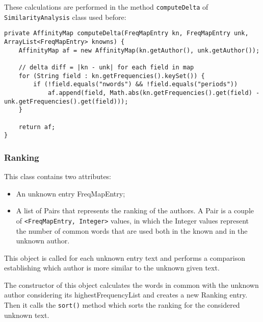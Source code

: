 \documentclass[a4paper,11pt, twoside]{article}
\begin{document}
	\noindent
	These calculations are performed in the method \lstinline|computeDelta| of \lstinline|SimilarityAnalysis| class used before:
	\begin{lstlisting}[firstnumber=104,caption={SimilarityAnalysis computeDelta method}, captionpos=b, label={lst:computeDelta}]
private AffinityMap computeDelta(FreqMapEntry kn, FreqMapEntry unk, ArrayList<FreqMapEntry> knowns) {
	AffinityMap af = new AffinityMap(kn.getAuthor(), unk.getAuthor());

	// delta diff = |kn - unk| for each field in map
	for (String field : kn.getFrequencies().keySet()) {
		if (!field.equals("nwords") && !field.equals("periods"))
			af.append(field, Math.abs(kn.getFrequencies().get(field) - unk.getFrequencies().get(field)));
	}

	return af;
}
	\end{lstlisting}
	
		\subsubsection{Ranking}
		This class contains two attributes:
		\begin{itemize}
			\item An unknown entry FreqMapEntry;
			\item A list of Pairs that represents the ranking of the authors. A Pair is a couple of \lstinline|<FreqMapEntry, Integer>| values, in which the Integer values represent the number of common words that are used both in the known and in the unknown author.
		\end{itemize}
		This object is called for each unknown entry text and performs a comparison establishing which author is more similar to the unknown given text.

		\bigskip
		\noindent
		The constructor of this object calculates the words in common with the unknown author considering its highestFrequencyList and creates a new Ranking entry. Then it calls the \lstinline|sort()| method which sorts the ranking for the considered unknown text.
		
\end{document}
